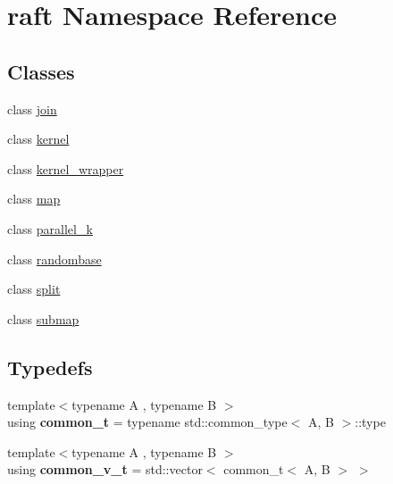 \hypertarget{namespaceraft}{}\section{raft Namespace Reference}
\label{namespaceraft}
\subsection*{Classes}
\begin{DoxyCompactItemize}
\item 
class \hyperlink{classraft_1_1join}{join}
\item 
class \hyperlink{classraft_1_1kernel}{kernel}
\item 
class \hyperlink{classraft_1_1kernel__wrapper}{kernel\+\_\+wrapper}
\item 
class \hyperlink{classraft_1_1map}{map}
\item 
class \hyperlink{classraft_1_1parallel__k}{parallel\+\_\+k}
\item 
class \hyperlink{classraft_1_1randombase}{randombase}
\item 
class \hyperlink{classraft_1_1split}{split}
\item 
class \hyperlink{classraft_1_1submap}{submap}
\end{DoxyCompactItemize}
\subsection*{Typedefs}
\begin{DoxyCompactItemize}
\item 
\hypertarget{namespaceraft_a8fa5dc256d5e10b99cc367c0f7e67214}{}\label{namespaceraft_a8fa5dc256d5e10b99cc367c0f7e67214} 
{\footnotesize template$<$typename A , typename B $>$ }\\using {\bfseries common\+\_\+t} = typename std\+::common\+\_\+type$<$ A, B $>$\+::type
\item 
\hypertarget{namespaceraft_a5ebab943f6e6118ff08b5f32b741059c}{}\label{namespaceraft_a5ebab943f6e6118ff08b5f32b741059c} 
{\footnotesize template$<$typename A , typename B $>$ }\\using {\bfseries common\+\_\+v\+\_\+t} = std\+::vector$<$ common\+\_\+t$<$ A, B $>$ $>$
\end{DoxyCompactItemize}
